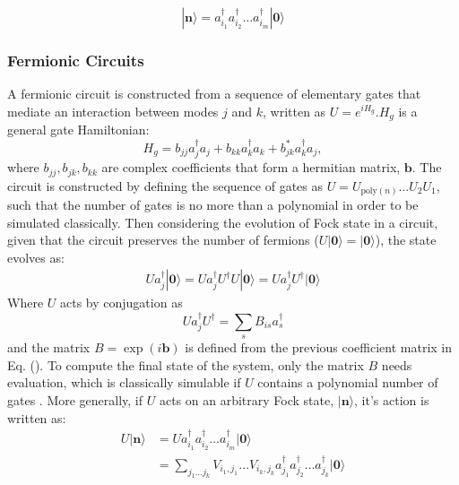 \begin{equation}
    |{\mathbf n}\rangle = a_{i_1}^{\dagger} a_{i_2}^{\dagger}\dots a_{i_m}^{\dagger}|{\mathbf 0}\rangle
\end{equation}

\subsubsection{Fermionic Circuits}
A fermionic circuit is constructed from a sequence of elementary gates that mediate an interaction between
modes $j$ and $k$, written as $U = e^{iH_g}$.$H_g$ is a general gate Hamiltonian:
\begin{equation}\label{gateham}
    H_g = b_{jj}a_j^{\dagger}a_j + b_{kk} a_{k}^{\dagger}a_{k} + b^{*}_{jk}a_k^{\dagger}a_j,
\end{equation}
where $b_{jj}, b_{jk}, b_{kk}$ are complex coefficients that form a hermitian matrix, $\mathbf b$.
The circuit is constructed by defining the
sequence of gates as $U = U_{\text{poly}(n)} \dots U_2 U_1$, such that the number of gates is no more than a
polynomial in order to be simulated classically. Then considering the evolution of Fock state in a circuit, given that the
circuit preserves the number of fermions ($U|{\mathbf 0}\rangle = |{\mathbf 0}\rangle  $), the state evolves as:
\begin{align}
    U a_j^{\dagger} |{\mathbf 0}\rangle = U a_j^{\dagger} U^{\dagger}U |{\mathbf 0}\rangle = U a_j^{\dagger} U^{\dagger} |{\mathbf 0}\rangle
\end{align}
Where $U$ acts by conjugation as
\begin{equation}
    U a_j^{\dagger} U^{\dagger} = \sum_s B_{is} a_s^{\dagger}
\end{equation}
and the matrix $B = \exp(i{\mathbf b})$ is defined from the previous coefficient matrix in Eq. ().
To compute the final state of the system, only the matrix $B$ needs evaluation, which is classically simulable if $U$ contains
a polynomial number of gates \cite{Terhal2001}. More generally, if $U$ acts on an arbitrary Fock state, $|{\mathbf n}\rangle$, it's action
is written as:
\begin{align}
    U |{\mathbf n}\rangle & = U a_{i_1}^{\dagger} a_{i_2}^{\dagger}\dots a_{i_m}^{\dagger}|{\mathbf 0}\rangle                                                    \\
                          & = \sum_{j_1 \dots j_k} V_{i_1, j_1} \dots V_{i_k, j_k} a_{j_1}^{\dagger} a_{j_2}^{\dagger}\dots a_{j_k}^{\dagger}|{\mathbf 0}\rangle
\end{align}
